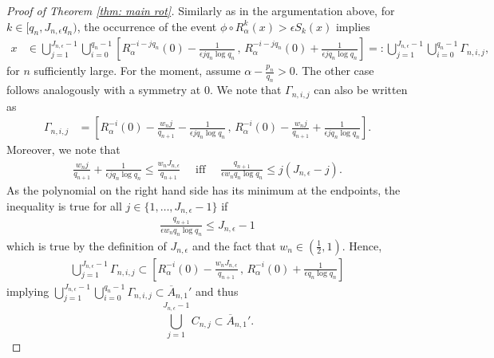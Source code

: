 \documentclass[11pt]{amsart}
\theoremstyle{definition}
\numberwithin{equation}{section}
\begin{document}
\begin{proof}[Proof of Theorem \ref{thm: main rot}]
Similarly as in the argumentation above, for $k\in [q_n,J_{n,\epsilon}q_n)$, the occurrence of the event $\phi\circ R_{\alpha}^k(x)>\epsilon S_k(x)$ implies 
\begin{align*}
 x&\in \bigcup_{j=1}^{J_{n,\epsilon}-1}\bigcup_{i=0}^{q_n-1} \left[R_{\alpha}^{-i-jq_n}(0)-\frac{1}{\epsilon  jq_n\log q_n}\,,\, R_{\alpha}^{-i-jq_n}(0)+ \frac{1}{\epsilon  jq_n\log q_n}\right]=:\bigcup_{j=1}^{J_{n,\epsilon}-1} \bigcup_{i=0}^{q_n-1}\Gamma_{n,i,j},
\end{align*}
for $n$ sufficiently large.
For the moment, assume $\alpha-\frac{p_n}{q_n}>0$. The other case follows analogously with a symmetry at $0$. 
We note that $\Gamma_{n,i,j}$ can also be written as
\begin{align*}
\Gamma_{n,i,j} & =\left[R_{\alpha}^{-i}(0)-\frac{w_n j}{q_{n+1}}-\frac{1}{\epsilon  jq_n\log q_n}\,,\, R_{\alpha}^{-i}(0)-\frac{w_n j}{q_{n+1}}+ \frac{1}{\epsilon  jq_n\log q_n}\right].
\end{align*}
Moreover, we note that 
\begin{align*}
 \frac{w_n j}{q_{n+1}}+\frac{1}{\epsilon  jq_n\log q_n}\leq \frac{w_n J_{n,\epsilon}}{q_{n+1}}\quad\text{ iff }\quad
 \frac{q_{n+1}}{\epsilon  w_n q_n\log q_n}\leq j(J_{n,\epsilon}-j).
\end{align*}
As the polynomial on the right hand side has its minimum at the endpoints, the inequality is true for all $j\in\{1,\ldots, J_{n,\epsilon}-1\}$ if 
\begin{align*}
 \frac{q_{n+1}}{\epsilon  w_n q_n\log q_n}\leq J_{n,\epsilon}-1
\end{align*}
which is true by the definition of $J_{n,\epsilon}$ and the fact that $w_n\in (\frac{1}{2}, 1)$.
Hence, 
\begin{align*}
 \bigcup_{j=1}^{J_{n,\epsilon}-1} \Gamma_{n,i,j}
 \subset \left[ R_{\alpha}^{-i}(0)-\frac{w_nJ_{n,\epsilon}}{q_{n+1}}\, , \, R_{\alpha}^{-i}(0)+\frac{1}{\epsilon q_n \log q_n}\right]
\end{align*}
implying  
$\bigcup_{j=1}^{J_{n,\epsilon}-1}\bigcup_{i=0}^{q_n-1} \Gamma_{n,i,j}\subset \overline{A}_{n,1}'$ and thus 
\begin{equation}
 \bigcup_{j=1}^{J_{n,\epsilon}-1} C_{n,j}\subset \overline{A}_{n,1}'.\label{eq: C subset A'}
\end{equation}


\end{proof}
\end{document}

